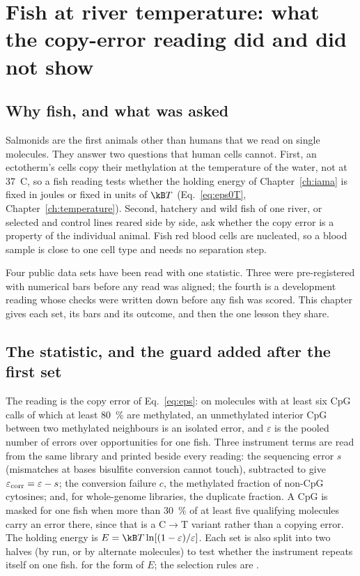 \chapter{Fish at river temperature: what the copy-error reading did and did not show}\label{ch:salmonid}

\section{Why fish, and what was asked}

Salmonids are the first animals other than humans that we read on single molecules. They answer two questions that human cells
cannot. First, an ectotherm's cells copy their methylation at the temperature of the water, not at 37~\textdegree C, so a fish
reading tests whether the holding energy of Chapter~\ref{ch:iama} is fixed in joules or fixed in units of $\kB T$
(Eq.~\eqref{eq:eps0T}, Chapter~\ref{ch:temperature}). Second, hatchery and wild fish of one river, or selected and control lines
reared side by side, ask whether the copy error is a property of the individual animal. Fish red blood cells are nucleated, so a
blood sample is close to one cell type and needs no separation step.

Four public data sets have been read with one statistic. Three were pre-registered with numerical bars before any read was
aligned; the fourth is a development reading whose checks were written down before any fish was scored. This chapter gives each
set, its bars and its outcome, and then the one lesson they share.

\section{The statistic, and the guard added after the first set}

The reading is the copy error of Eq.~\eqref{eq:eps}: on molecules with at least six CpG calls of which at least 80~\% are
methylated, an unmethylated interior CpG between two methylated neighbours is an isolated error, and $\varepsilon$ is the pooled
number of errors over opportunities for one fish. Three instrument terms are read from the same library and printed beside every
reading: the sequencing error $s$ (mismatches at bases bisulfite conversion cannot touch), subtracted to give
$\varepsilon_{\rm corr}=\varepsilon-s$; the conversion failure $c$, the methylated fraction of non-CpG cytosines; and, for
whole-genome libraries, the duplicate fraction. A CpG is masked for one fish when more than 30~\% of at least five qualifying
molecules carry an error there, since that is a C$\to$T variant rather than a copying error. The holding energy is
$E=\kB T\ln[(1-\varepsilon)/\varepsilon]$. Each set is also split into two halves (by run, or by alternate molecules) to test
whether the instrument repeats itself on one fish. \derived{} for the form of $E$; the selection rules are \calibrated.

